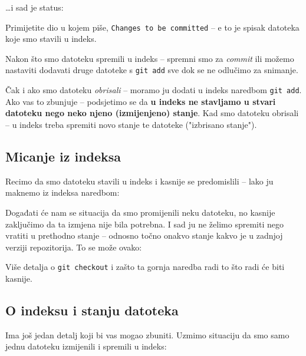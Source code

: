 
\dots{}i sad je status:



Primijetite dio u kojem piše, \verb+Changes to be committed+ -- e to je spisak datoteka koje smo stavili u indeks.

Nakon što smo datoteku spremili u indeks -- spremni smo za \emph{commit} ili možemo nastaviti dodavati druge datoteke s \verb+git add+ sve dok se ne odlučimo za snimanje.

Čak i ako smo datoteku \emph{obrisali} -- moramo ju dodati u indeks naredbom \verb+git add+.
Ako vas to zbunjuje -- podsjetimo se da \textbf{u indeks ne stavljamo u stvari datoteku nego neko njeno (izmijenjeno) stanje}.
Kad smo datoteku obrisali -- u indeks treba spremiti novo stanje te datoteke ("izbrisano stanje").

\subsection*{Micanje iz indeksa}

Recimo da smo datoteku stavili u indeks i kasnije se predomislili -- lako ju maknemo iz indeksa naredbom:


Događati će nam se situacija da smo promijenili neku datoteku, no kasnije zaključimo da ta izmjena nije bila potrebna. 
I sad ju ne želimo spremiti nego vratiti u prethodno stanje -- odnosno točno onakvo stanje kakvo je u zadnjoj verziji repozitorija.
To se može ovako:


Više detalja o \verb+git checkout+ i zašto ta gornja naredba radi to što radi će biti kasnije.

\subsection*{O indeksu i stanju datoteka}

Ima još jedan detalj koji bi vas mogao zbuniti. 
Uzmimo situaciju da smo samo jednu datoteku izmijenili i spremili u indeks:



